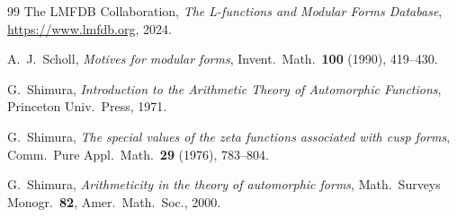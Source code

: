 \documentclass[11pt,a4paper]{amsart}
\theoremstyle{plain}
\theoremstyle{definition}
\begin{document}
\begin{thebibliography}{99}
The LMFDB Collaboration,
\emph{The L-functions and Modular Forms Database},
\url{https://www.lmfdb.org}, 2024.

A.~J.~Scholl,
\textit{Motives for modular forms},
Invent.\ Math.\ \textbf{100} (1990), 419--430.

G.~Shimura,
\textit{Introduction to the Arithmetic Theory of Automorphic Functions},
Princeton Univ.\ Press, 1971.

G.~Shimura,
\textit{The special values of the zeta functions associated with cusp forms},
Comm.\ Pure Appl.\ Math.\ \textbf{29} (1976), 783--804.

G.~Shimura,
\textit{Arithmeticity in the theory of automorphic forms},
Math.\ Surveys Monogr.\ \textbf{82}, Amer.\ Math.\ Soc., 2000.

\end{thebibliography}
\end{document}
